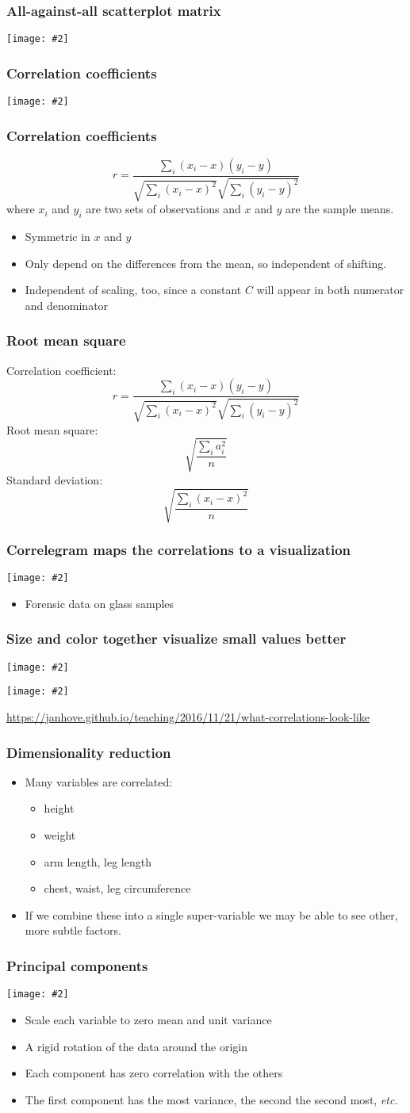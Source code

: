 \documentclass{beamer}
\newcommand{\bi}{\begin{itemize}}
\newcommand{\li}{\item}
\newcommand{\ei}{\end{itemize}}
\newcommand{\fig}[2]{\centerline{\texttt{[image: \#2]}}}
\newcommand{\bfr}[1]{\begin{frame}[fragile]\frametitle{{ #1 }}}
\begin{document}
\bfr{All-against-all scatterplot matrix}
\fig{1}{blue-jays-scatter-all-1.png}
\end{frame}

\bfr{Correlation coefficients}
\fig{1}{correlations-1.png}
\end{frame}

\bfr{Correlation coefficients}
\[
r = \frac{\sum_i (x_i - x)(y_i - y)}{\sqrt{\sum_i(x_i-x)^2}\sqrt{\sum_i(y_i-y)^2}}
\]
where $x_i$ and $y_i$ are two sets of observations and $x$ and $y$
are the sample means.
\bi
\li Symmetric in $x$ and $y$
\li Only depend on the differences from the mean, so independent of shifting.
\li Independent of scaling, too, since a constant $C$ will appear in both
numerator and denominator
\ei
\end{frame}

\bfr{Root mean square}
Correlation coefficient:
\[
r = \frac{\sum_i (x_i - x)(y_i - y)}{\sqrt{\sum_i(x_i-x)^2}\sqrt{\sum_i(y_i-y)^2}}
\]
Root mean square:
\[
\sqrt{\frac{\sum_i a_i^2}{n}}
\]
Standard deviation:
\[
\sqrt{\frac{\sum_i(x_i-x)^2}{n}}
\]
\end{frame}


\bfr{Correlegram maps the correlations to a visualization}
\fig{.6}{forensic-correlations1-1.png}
\bi\li Forensic data on glass samples\ei
\end{frame}

\bfr{Size and color together visualize small values better}
\fig{.6}{forensic-correlations2-1.png}
\end{frame}


\begin{frame}
\fig{.8}{unnamed-chunk-10-1.png}
\vfill
\tiny
\url{https://janhove.github.io/teaching/2016/11/21/what-correlations-look-like}
\end{frame}

\bfr{Dimensionality reduction}
\bi
\li Many variables are correlated:
\bi
\li height
\li weight
\li arm length, leg length
\li chest, waist, leg circumference
\ei
\li If we combine these into a single super-variable
we may be able to see other, more subtle factors.
\ei
\end{frame}

\bfr{Principal components}
\fig{1}{blue-jays-PCA-1.png}
\bi
\li Scale each variable to zero mean and unit variance
\li A rigid rotation of the data around the origin
\li Each component has zero correlation with the others
\li The first component has the most variance, the second
the second most, {\em etc.}
\ei
\end{frame}
\end{document}
